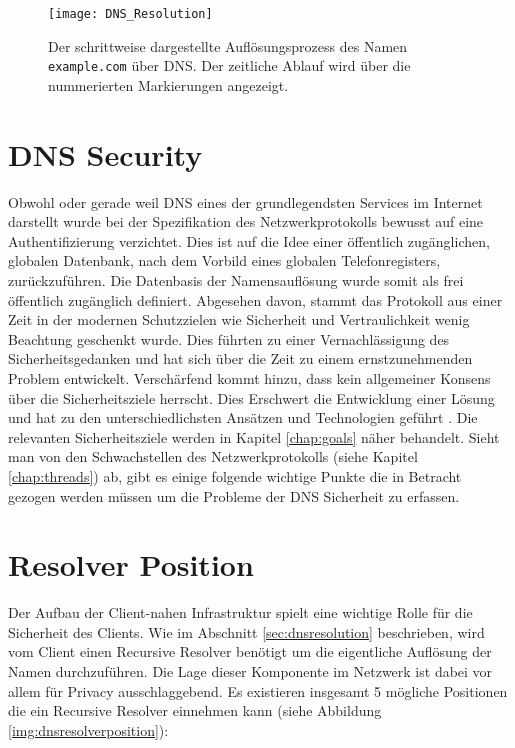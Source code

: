 \begin{figure}[htbp]
    \centering
    \texttt{[image: DNS\_Resolution]}
    \caption{Der schrittweise dargestellte Auflösungsprozess des Namen \texttt{example.com} über DNS. Der zeitliche Ablauf wird über die nummerierten Markierungen angezeigt.}
    \label{img:dnsresolution}
\end{figure}

\section{DNS Security}
\label{sec:dnssecurity}

Obwohl oder gerade weil DNS eines der grundlegendsten Services im Internet darstellt wurde bei der Spezifikation des Netzwerkprotokolls bewusst auf eine Authentifizierung verzichtet. Dies ist auf die Idee einer öffentlich zugänglichen, globalen Datenbank, nach dem Vorbild eines globalen Telefonregisters, zurückzuführen. Die Datenbasis der Namensauflösung wurde somit als frei öffentlich zugänglich definiert. Abgesehen davon, stammt das Protokoll aus einer Zeit in der modernen Schutzzielen wie Sicherheit und Vertraulichkeit wenig Beachtung geschenkt wurde. Dies führten zu einer Vernachlässigung des Sicherheitsgedanken und hat sich über die Zeit zu einem ernstzunehmenden Problem entwickelt. Verschärfend kommt hinzu, dass kein allgemeiner Konsens über die Sicherheitsziele herrscht. Dies Erschwert die Entwicklung einer Lösung und hat zu den unterschiedlichsten Ansätzen und Technologien geführt \cite{Grothoff2018}. Die relevanten Sicherheitsziele werden in Kapitel \ref{chap:goals} näher behandelt. Sieht man von den Schwachstellen des Netzwerkprotokolls (siehe Kapitel \ref{chap:threads}) ab, gibt es einige folgende wichtige Punkte die in Betracht gezogen werden müssen um die Probleme der DNS Sicherheit zu erfassen.

\section{Resolver Position}
Der Aufbau der Client-nahen Infrastruktur spielt eine wichtige Rolle für die Sicherheit des Clients. Wie im Abschnitt \ref{sec:dnsresolution} beschrieben, wird vom Client einen Recursive Resolver benötigt um die eigentliche Auflösung der Namen durchzuführen. Die Lage dieser Komponente im Netzwerk ist dabei vor allem für Privacy ausschlaggebend. Es existieren insgesamt 5 mögliche Positionen die ein Recursive Resolver einnehmen kann\cite{VanHeugten2018} (siehe Abbildung \ref{img:dnsresolverposition}):

